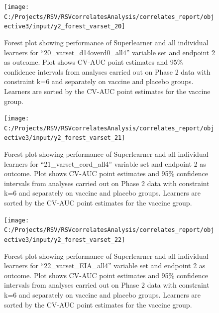 \documentclass[11pt]{article}
\begin{document}
\begin{figure}[H]

{\centering \texttt{[image: C:/Projects/RSV/RSVcorrelatesAnalysis/correlates\_report/objective3/input/y2\_forest\_varset\_20]} 

}

\caption[Forest plot for ``20\_varset\_d14overd0\_all4'' variable set, endpoint 2.]{Forest plot showing performance of Superlearner and all individual learners for ``20\_varset\_d14overd0\_all4'' variable set and endpoint 2 as outcome. Plot shows CV-AUC point estimates and 95\% confidence intervals from analyses carried out on Phase 2 data with constraint k=6 and separately on vaccine and placebo groups. Learners are sorted by the CV-AUC point estimates for the vaccine group.}\label{fig:y2-forest-varset-20}
\end{figure}

\begin{figure}[H]

{\centering \texttt{[image: C:/Projects/RSV/RSVcorrelatesAnalysis/correlates\_report/objective3/input/y2\_forest\_varset\_21]} 

}

\caption[Forest plot for ``21\_varset\_cord\_all4'' variable set, endpoint 2.]{Forest plot showing performance of Superlearner and all individual learners for ``21\_varset\_cord\_all4'' variable set and endpoint 2 as outcome. Plot shows CV-AUC point estimates and 95\% confidence intervals from analyses carried out on Phase 2 data with constraint k=6 and separately on vaccine and placebo groups. Learners are sorted by the CV-AUC point estimates for the vaccine group.}\label{fig:y2-forest-varset-21}
\end{figure}

\begin{figure}[H]

{\centering \texttt{[image: C:/Projects/RSV/RSVcorrelatesAnalysis/correlates\_report/objective3/input/y2\_forest\_varset\_22]} 

}

\caption[Forest plot for ``22\_varset\_EIA\_all4'' variable set, endpoint 2.]{Forest plot showing performance of Superlearner and all individual learners for ``22\_varset\_EIA\_all4'' variable set and endpoint 2 as outcome. Plot shows CV-AUC point estimates and 95\% confidence intervals from analyses carried out on Phase 2 data with constraint k=6 and separately on vaccine and placebo groups. Learners are sorted by the CV-AUC point estimates for the vaccine group.}\label{fig:y2-forest-varset-22}
\end{figure}
\end{document}
